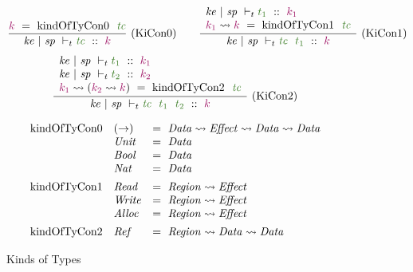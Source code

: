 \begin{figure}
{%
$$
\ruleIL {KiCon0}
{       \ck{k} ~=~ \trm{kindOfTyCon0}~~ \ct{\mtc}
}
{       \KindT  {\mke}
                {\msp}
                {\mtc}
                {k}
}
\qq
%
\ruleIL {KiCon1}
{ \begin{array}{ll}
        \KindT  {\mke}
                {\msp}
                {t_1}
                {k_1}
\\
       \ck{k_1} \kto \ck{k} 
                ~=~ \trm{kindOfTyCon1}~~ \ct{\mtc}
  \end{array}
}
{       \KindT  {\mke}
                {\msp}
                {\mtc~~ t_1}
                {k}
}
$$
$$
\ruleIL {KiCon2}
{ \begin{array}{ll}
        \KindT  {\mke}
                {\msp}
                {t_1}
                {k_1}
\\
        \KindT  {\mke}
                {\msp}
                {t_2}
                {k_2}
\\
        \ck{k_1} \kto (\ck{k_2} \kto \ck{k}) 
                ~=~ \trm{kindOfTyCon2}~~ \ct{\mtc}
  \end{array}
}
{       \KindT  {\mke}
                {\msp}
                {\mtc~~ t_1~~ t_2}
                {k}
}
$$

$$
\begin{array}{lll}
\trm{kindOfTyCon0} 
        & (\to)         & =~ \kcData \kto \kcEffect \kto \kcData \kto \kcData \\
        & \tcUnit       & =~ \kcData                              \\
        & \tcBool       & =~ \kcData                              \\
        & \tcNat        & =~ \kcData                              
\\[1ex]

\trm{kindOfTyCon1}
        & \tcRead       & =~ \kcRegion \kto \kcEffect             \\
        & \tcWrite      & =~ \kcRegion \kto \kcEffect             \\
        & \tcAlloc      & =~ \kcRegion \kto \kcEffect
\\[1ex]

\trm{kindOfTyCon2}
        & \tcRef        & =~ \kcRegion \kto \kcData \kto \kcData  \\
\end{array}
$$

} %
\medskip
\caption{Kinds of Types}
\label{f:KindT}
\end{figure}

